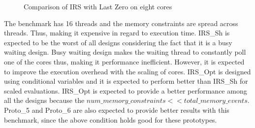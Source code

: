 \begin{figure}[h]
     \centering
     \caption{Comparison of IRS with Last Zero on eight cores}
\end{figure}

The benchmark has 16 threads and the memory constraints are spread across threads. 
Thus, making it expensive in regard to execution time. 
IRS\_Sh is expected to be the worst of all designs considering the fact that it is a busy waiting design. 
Busy waiting design makes the waiting thread to constantly poll one of the cores thus, making it performance inefficient. 
However, it is expected to improve the execution overhead with the scaling of cores. 
IRS\_Opt is designed using conditional variables and it is expected to perform better than IRS\_Sh for scaled evaluations.
IRS\_Opt is expected to provide a better performance among all the designs because the $num\_memory\_constraints << total\_memory\_events$. 
Proto\_5 and Proto\_6 are also expected to provide better results with this benchmark, since the above condition holds good for these prototypes.

